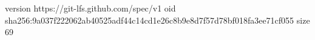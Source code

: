 version https://git-lfs.github.com/spec/v1
oid sha256:9a037f222062ab40525adf44c14cd1e26c8b9e8d7f57d78bf018fa3ee71cf055
size 69
